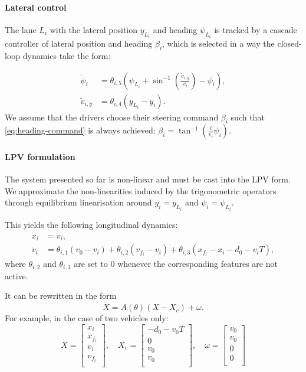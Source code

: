\documentclass{article}
\begin{document}
\paragraph{Lateral control}

The lane $L_i$ with the lateral position $y_{L_i}$ and heading $\psi_{L_i}$ is tracked by a cascade controller of lateral position and heading $\beta_i$, which is selected in a way the closed-loop dynamics take the form:

\begin{align}
	\label{eq:heading-command}
    \dot{\psi}_i &= \theta_{i,5}\left(\psi_{L_i}+\sin^{-1}\left(\frac{\tilde{v}_{i,y}}{v_i}\right)-\psi_i\right),\\
    \tilde{v}_{i,y} &= \theta_{i,4} (y_{L_i}-y_i). \nonumber
\end{align}
We assume that the drivers choose their steering command $\beta_i$ such that \eqref{eq:heading-command} is always achieved: $\beta_i = \tan^{-1}(\frac{l}{v_i}\dot{\psi}_i)$.

\paragraph{LPV formulation}

The system presented so far is non-linear and must be cast into the LPV form. We approximate the non-linearities induced by the trigonometric operators through equilibrium linearisation around $y_i=y_{L_i}$ and $\psi_i=\psi_{L_i}$.

This yields the following longitudinal dynamics:
\begin{align*}
\dot{x}_i &= v_i,\\
\dot v_i &= \theta_{i,1} (v_0 - v_i) + \theta_{i,2} (v_{f_i} - v_i) + \theta_{i,3}(x_{f_i} - x_i - d_0 - v_i T),
\end{align*}
where $\theta_{i,2}$ and $\theta_{i,3}$ are set to $0$ whenever the corresponding features are not active.

It can be rewritten in the form $$\dot{X} = A(\theta)(X-X_c) + \omega.$$ For example, in the case of two vehicles only:
\begin{equation*}
    X = \begin{bmatrix}
x_i \\
x_{f_i} \\
v_i \\
v_{f_i} \\
\end{bmatrix}
,\quad
X_c = \begin{bmatrix}
-d_0-v_0 T \\
0 \\
v_0\\
v_0 \\
\end{bmatrix}
,\quad
\omega = \begin{bmatrix}
v_0 \\
v_0 \\
0\\
0\\
\end{bmatrix}
\end{equation*}
\end{document}
